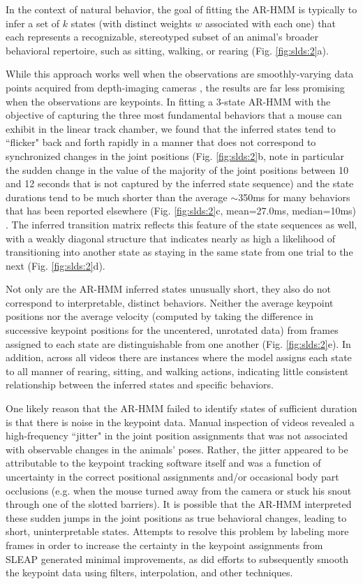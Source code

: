 In the context of natural behavior, the goal of fitting the AR-HMM is typically to infer a set of $k$ states (with distinct weights $w$ associated with each one) that each represents a recognizable, stereotyped subset of an animal's broader behavioral repertoire, such as sitting, walking, or rearing (Fig. \ref{fig:slds:2}a).

While this approach works well when the observations are smoothly-varying data points acquired from depth-imaging cameras \cite{wiltschko_mapping_2015, markowitz_striatum_2018, wiltschko_revealing_2020}, the results are far less promising when the observations are keypoints. In fitting a 3-state AR-HMM with the objective of capturing the three most fundamental behaviors that a mouse can exhibit in the linear track chamber, we found that the inferred states tend to ``flicker" back and forth rapidly in a manner that does not correspond to synchronized changes in the joint positions (Fig. \ref{fig:slds:2}b, note in particular the sudden change in the value of the majority of the joint positions between 10 and 12 seconds that is not captured by the inferred state sequence) and the state durations tend to be much shorter than the average $\sim$350ms for many behaviors that has been reported elsewhere (Fig. \ref{fig:slds:2}c, mean=27.0ms, median=10ms) \cite{wiltschko_mapping_2015}. The inferred transition matrix reflects this feature of the state sequences as well, with a weakly diagonal structure that indicates nearly as high a likelihood of transitioning into another state as staying in the same state from one trial to the next (Fig. \ref{fig:slds:2}d). 

Not only are the AR-HMM inferred states unusually short, they also do not correspond to interpretable, distinct behaviors. Neither the average keypoint positions nor the average velocity (computed by taking the difference in successive keypoint positions for the uncentered, unrotated data) from frames assigned to each state are distinguishable from one another (Fig. \ref{fig:slds:2}e). In addition, across all videos there are instances where the model assigns each state to all manner of rearing, sitting, and walking actions, indicating little consistent relationship between the inferred states and specific behaviors. 

One likely reason that the AR-HMM failed to identify states of sufficient duration is that there is noise in the keypoint data. Manual inspection of videos revealed a high-frequency ``jitter" in the joint position assignments that was not associated with observable changes in the animals' poses. Rather, the jitter appeared to be attributable to the keypoint tracking software itself and was a function of uncertainty in the correct positional assignments and/or occasional body part occlusions (e.g. when the mouse turned away from the camera or stuck his snout through one of the slotted barriers). It is possible that the AR-HMM interpreted these sudden jumps in the joint positions as true behavioral changes, leading to short, uninterpretable states. Attempts to resolve this problem by labeling more frames in order to increase the certainty in the keypoint assignments from SLEAP generated minimal improvements, as did efforts to subsequently smooth the keypoint data using filters, interpolation, and other techniques. 